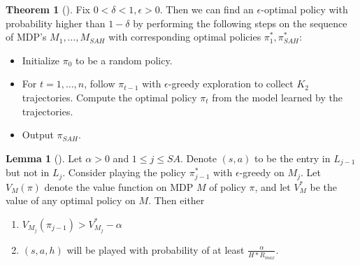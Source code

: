 \documentclass[12pt, letterpaper]{article}
\theoremstyle{definition}
\newtheorem*{thm}{Theorem}
\newtheorem*{lemma}{Lemma}
\theoremstyle{remark}
\begin{document}
\begin{thm}[]
    Fix \(0 < \delta < 1, \epsilon > 0\). Then we can find an \(\epsilon\)-optimal policy with probability higher than \(1 - \delta\) by performing the following steps on the sequence of MDP's \(M_1, \ldots, M_{SAH}\) with corresponding optimal policies \(\pi^*_{1}, \pi^{*}_{SAH}\):

    \begin{itemize}
        \item Initialize \(\pi_0\) to be a random policy.
        \item For \(t = 1, \ldots, n\), follow \(\pi_{t-1}\) with \(\epsilon\)-greedy exploration to collect \(K_2\) trajectories. Compute the optimal policy \(\pi_t\) from the model learned by the trajectories.
        \item Output \(\pi_{SAH}\).
    \end{itemize}
    
\end{thm}


\begin{lemma}[]
    Let \(\alpha > 0\) and \(1 \leq j \leq SA\). Denote \((s, a)\) to be the entry in \(L_{j-1}\) but not in \(L_{j}\). Consider playing the policy \(\pi_{j-1}^*\) with \(\epsilon\)-greedy on \(M_j\). Let \(V_{M}(\pi)\) denote the value function on MDP \(M\) of policy \(\pi\), and let \(V^*_{M}\) be the value of any optimal policy on \(M\). Then either

    \begin{enumerate}
        \item \(V_{M_j} (\pi_{j-1}) > V^*_{M_j} - \alpha\)
        \item \((s, a, h)\) will be played with probability of at least \(\frac{\alpha}{H*R_{max}}\).
    \end{enumerate}
    
\end{lemma}
\end{document}
